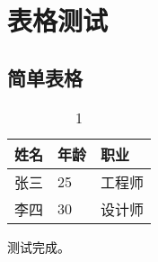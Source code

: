 \documentclass[UTF8, a4paper, 12pt]{ctexart}
\begin{document}
\section{表格测试}


\subsection{简单表格}


\begin{table}[H]
    \centering
    \caption{1}
    \label{tab:table1}
    \begin{tabular}{|l|l|l|}
        \toprule
        \textbf{姓名} & \textbf{年龄} & \textbf{职业} \\
        \midrule
        张三 & 25 & 工程师 \\
        李四 & 30 & 设计师 \\
        \bottomrule
    \end{tabular}
\end{table}

测试完成。
\end{document}
